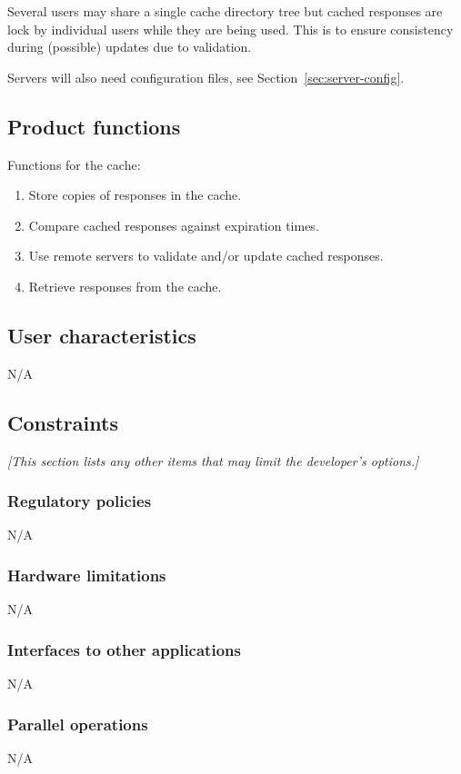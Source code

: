 \documentclass{article}
\begin{document}
Several users may share a single cache directory tree but cached responses
are lock by individual users while they are being used. This is to ensure
consistency during (possible) updates due to validation.

Servers will also need configuration files, see
Section~\ref{sec:server-config}.

\subsection{Product functions}
Functions for the cache:
\begin{enumerate}
\item Store copies of responses in the cache.
\item Compare cached responses against expiration times.
\item Use remote servers to validate and/or update cached responses.
\item Retrieve responses from the cache.
\end{enumerate}

\subsection{User characteristics}
N/A

\subsection{Constraints}
\emph{[This section lists any other items that may limit the developer's
  options.]}

\subsubsection{Regulatory policies}
N/A

\subsubsection{Hardware limitations}
N/A

\subsubsection{Interfaces to other applications}
N/A

\subsubsection{Parallel operations}
N/A 
\end{document}
